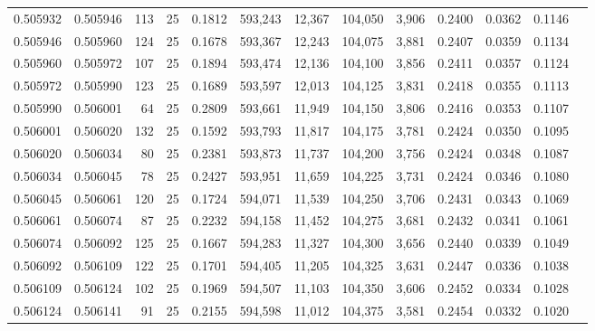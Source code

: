 \begin{tabular}{rrrrrrrrrrrrr}
0.505932 & 0.505946 & 113 &  25 &                                     0.1812 & 593,243 &  12,367 & 104,050 &   3,906 & 0.2400 & 0.0362 & 0.1146 \\
0.505946 & 0.505960 & 124 &  25 &                                     0.1678 & 593,367 &  12,243 & 104,075 &   3,881 & 0.2407 & 0.0359 & 0.1134 \\
0.505960 & 0.505972 & 107 &  25 &                                     0.1894 & 593,474 &  12,136 & 104,100 &   3,856 & 0.2411 & 0.0357 & 0.1124 \\
0.505972 & 0.505990 & 123 &  25 &                                     0.1689 & 593,597 &  12,013 & 104,125 &   3,831 & 0.2418 & 0.0355 & 0.1113 \\
0.505990 & 0.506001 &  64 &  25 &                                     0.2809 & 593,661 &  11,949 & 104,150 &   3,806 & 0.2416 & 0.0353 & 0.1107 \\
0.506001 & 0.506020 & 132 &  25 &                                     0.1592 & 593,793 &  11,817 & 104,175 &   3,781 & 0.2424 & 0.0350 & 0.1095 \\
0.506020 & 0.506034 &  80 &  25 &                                     0.2381 & 593,873 &  11,737 & 104,200 &   3,756 & 0.2424 & 0.0348 & 0.1087 \\
0.506034 & 0.506045 &  78 &  25 &                                     0.2427 & 593,951 &  11,659 & 104,225 &   3,731 & 0.2424 & 0.0346 & 0.1080 \\
0.506045 & 0.506061 & 120 &  25 &                                     0.1724 & 594,071 &  11,539 & 104,250 &   3,706 & 0.2431 & 0.0343 & 0.1069 \\
0.506061 & 0.506074 &  87 &  25 &                                     0.2232 & 594,158 &  11,452 & 104,275 &   3,681 & 0.2432 & 0.0341 & 0.1061 \\
0.506074 & 0.506092 & 125 &  25 &                                     0.1667 & 594,283 &  11,327 & 104,300 &   3,656 & 0.2440 & 0.0339 & 0.1049 \\
0.506092 & 0.506109 & 122 &  25 &                                     0.1701 & 594,405 &  11,205 & 104,325 &   3,631 & 0.2447 & 0.0336 & 0.1038 \\
0.506109 & 0.506124 & 102 &  25 &                                     0.1969 & 594,507 &  11,103 & 104,350 &   3,606 & 0.2452 & 0.0334 & 0.1028 \\
0.506124 & 0.506141 &  91 &  25 &                                     0.2155 & 594,598 &  11,012 & 104,375 &   3,581 & 0.2454 & 0.0332 & 0.1020 \\

\end{tabular}
